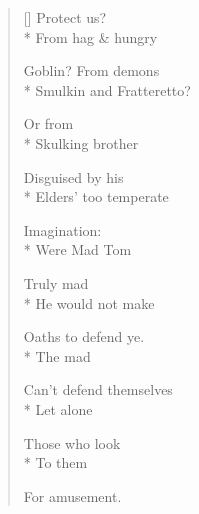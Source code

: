 \label{ch:lear_aq}
\settowidth{\versewidth}{Smulkin and Fratteretto?}
\begin{verse}[\versewidth]
Protect us?\\*
From hag \& hungry

Goblin? From demons\\*
Smulkin and Fratteretto?

Or from\\*
Skulking brother

Disguised by his\\*
Elders' too temperate

Imagination:\\*
Were Mad Tom

Truly mad\\*
He would not make

Oaths to defend ye.\\*
The mad

Can't defend themselves\\*
Let alone

Those who look\\*
To them

For amusement.
\end{verse}
